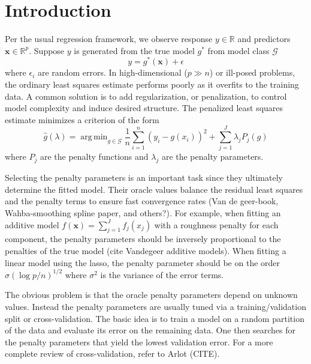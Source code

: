\documentclass[12pt]{article}
\DeclareMathOperator*{\argmin}{arg\,min}
\begin{document}
\newpage
{} %
\section{Introduction}

Per the usual regression framework, we observe response $y \in \mathbb{R}$ and predictors $\boldsymbol {x} \in \mathbb{R}^p$. Suppose $y$ is generated from the true model $g^*$ from model class $\mathcal{G}$
\begin{equation}
y = g^*(\boldsymbol x) + \epsilon
\end{equation}
where $\epsilon_i$ are random errors. In high-dimensional ($p \gg n$) or ill-posed problems, the ordinary least squares estimate performs poorly as it overfits to the training data. A common solution is to add regularization, or penalization, to control model complexity and induce desired structure. The penalized least squares estimate minimizes a criterion of the form
\begin{equation}
\label{orig_train_criterion}
\hat{g}(\lambda) = \argmin_{g\in \mathcal{G}} \frac{1}{n} \sum_{i=1}^n \left (y_i -  g(x_i) \right )^2 + \sum_{j=1}^J \lambda_j P_j(g)
\end{equation}
where $P_j$ are the penalty functions and $\lambda_j$ are the penalty parameters.

Selecting the penalty parameters is an important task since they ultimately determine the fitted model. Their oracle values balance the residual least squares and the penalty terms to ensure fast convergence rates (Van de geer-book, Wahba-smoothing spline paper, and others?). For example, when fitting an additive model $f(\boldsymbol x) = \sum_{j=1}^J f_j(x_j)$ with a roughness penalty for each component, the penalty parameters should be inversely proportional to the penalties of the true model (cite Vandegeer additive models). When fitting a linear model using the lasso, the penalty parameter should be on the order $\sigma (\log p /n )^{1/2}$ where $\sigma^2$ is the variance of the error terms.

The obvious problem is that the oracle penalty parameters depend on unknown values. Instead the penalty parameters are usually tuned via a training/validation split or cross-validation. The basic idea is to train a model on a random partition of the data and evaluate its error on the remaining data. One then searches for the penalty parameters that yield the lowest validation error. For a more complete review of cross-validation, refer to Arlot (CITE).
\end{document}
